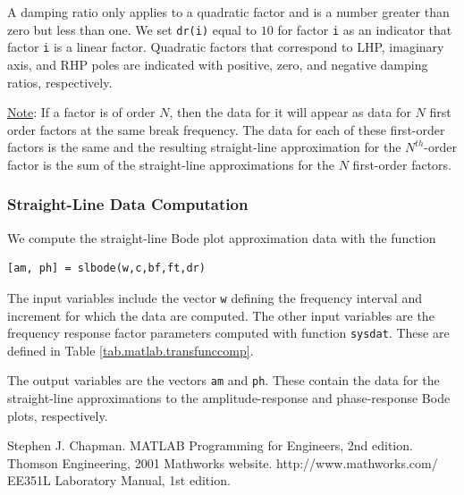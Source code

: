 \par
A damping ratio only applies to a quadratic factor and is a number greater than zero but less than one.  We set \verb=dr(i)= equal to $10$ for factor \verb=i= as an indicator that factor \verb=i= is a linear factor.  Quadratic factors that correspond to LHP, imaginary axis, and RHP poles are indicated with positive, zero, and negative damping ratios, respectively.
\par
\uline{Note}: If a factor is of order $N$, then the data for it will appear as data for $N$ first order factors at the same break frequency.  The data for each of these first-order factors is the same and the resulting straight-line approximation for the $N^{th}$-order factor is the sum of the straight-line approximations for the $N$ first-order factors.

\subsubsection{Straight-Line Data Computation}
We compute the straight-line Bode plot approximation data with the function
\begin{verbatim}
[am, ph] = slbode(w,c,bf,ft,dr)
\end{verbatim}
The input variables include the vector \verb=w= defining the frequency interval and increment for which the data are computed.  The other input variables are the frequency  response factor parameters computed with function \verb=sysdat=.  These are defined in Table \ref{tab.matlab.transfunccomp}.
\par
The output variables are the vectors \verb=am= and \verb=ph=.  These contain the data for the straight-line approximations to the amplitude-response and phase-response Bode plots, respectively.

\begin{thebibliography}{9}
     Stephen J. Chapman. MATLAB Programming for Engineers, 2nd edition.  Thomson Engineering, 2001
     Mathworks website.  http://www.mathworks.com/
     EE351L Laboratory Manual, 1st edition.
\end{thebibliography}